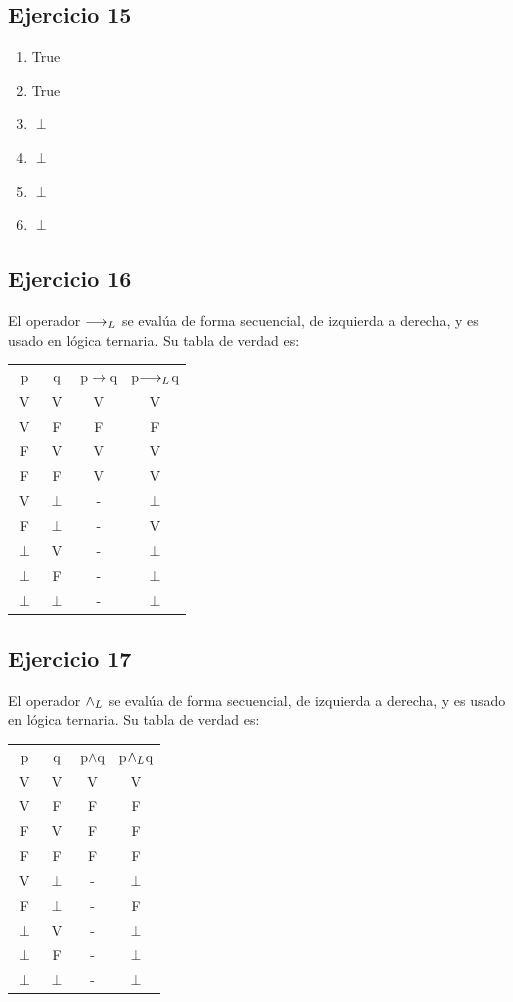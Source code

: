 	\subsection{Ejercicio 15}
		\begin{enumerate}[label=(\alph*)]
			\item True
			\item True
			\item $\perp$
			\item $\perp$
			\item $\perp$
			\item $\perp$ 
		\end{enumerate}
	\subsection{Ejercicio 16}
		El operador $\longrightarrow _L$ se evalúa de forma secuencial, de izquierda a derecha, y es usado en lógica ternaria. Su tabla de verdad es:\\
		\begin{tabular}{c|c|c|c}
			p & q & p$\rightarrow$q & p$\longrightarrow _L$q\\
			V & V & V & V\\
			V & F & F & F\\
			F & V & V & V\\
			F & F & V & V\\
			V & $\perp$ & - & $\perp$\\
			F & $\perp$ & - & V\\
			$\perp$ & V & - & $\perp$\\
			$\perp$ & F & - & $\perp$\\
			$\perp$ & $\perp$ & - & $\perp$\\
		\end{tabular}
	\subsection{Ejercicio 17}
		El operador $\land _L$ se evalúa de forma secuencial, de izquierda a derecha, y es usado en lógica ternaria. Su tabla de verdad es:\\
		\begin{tabular}{c|c|c|c}
			p & q & p$\wedge$q & p$\land _L$q\\
			V & V & V & V\\
			V & F & F & F\\
			F & V & F & F\\
			F & F & F & F\\
			V & $\perp$ & - & $\perp$\\
			F & $\perp$ & - & F\\
			$\perp$ & V & - & $\perp$\\
			$\perp$ & F & - & $\perp$\\
			$\perp$ & $\perp$ & - & $\perp$\\
		\end{tabular}
